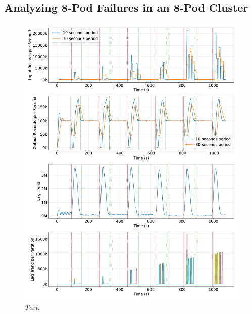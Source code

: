 \subsection{Analyzing 8-Pod Failures in an 8-Pod Cluster}\label{subsec:analyzing-8-pod-failures-in-an-8-pod-cluster2}

\begin{figure}[ht]
    \centering
    \includegraphics[width=1\textwidth]{figures/flink-8pods/flink_8_pods_plot_impact}
    \caption{\textit{Text.}}
    \label{fig:flink-8pods-impact}
\end{figure}


